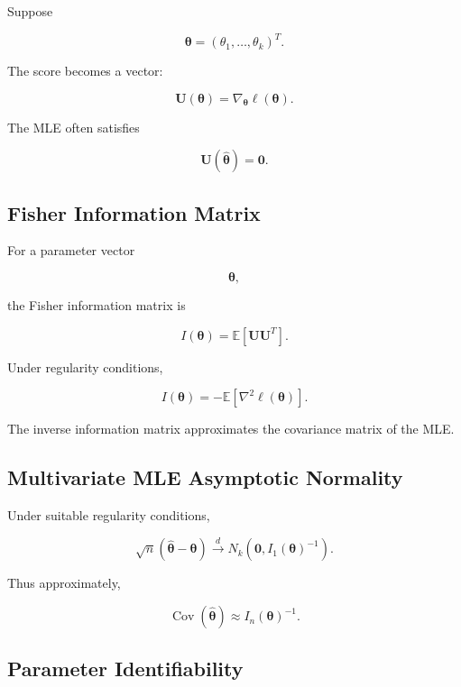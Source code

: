 Suppose

\[
\boldsymbol{\theta}
=
(\theta_1,\ldots,\theta_k)^T.
\]

The score becomes a vector:

\[
\boxed{
\mathbf{U}(\boldsymbol{\theta})
=
\nabla_{\boldsymbol{\theta}}
\ell(\boldsymbol{\theta}).
}
\]

The MLE often satisfies

\[
\boxed{
\mathbf{U}
(
\widehat{\boldsymbol{\theta}}
)
=
\mathbf{0}.
}
\]

\subsection{Fisher Information Matrix}
\label{subsec:fisher-information-matrix}

For a parameter vector

\[
\boldsymbol{\theta},
\]

the Fisher information matrix is

\[
\boxed{
I(\boldsymbol{\theta})
=
\mathbb{E}
\left[
\mathbf{U}
\mathbf{U}^T
\right].
}
\]

Under regularity conditions,

\[
\boxed{
I(\boldsymbol{\theta})
=
-
\mathbb{E}
\left[
\nabla^2
\ell(\boldsymbol{\theta})
\right].
}
\]

The inverse information matrix approximates the covariance matrix of the
MLE.

\subsection{Multivariate MLE Asymptotic Normality}
\label{subsec:multivariate-mle-normality}

Under suitable regularity conditions,

\[
\boxed{
\sqrt{n}
\left(
\widehat{\boldsymbol{\theta}}
-
\boldsymbol{\theta}
\right)
\xrightarrow{d}
N_k
\left(
\mathbf{0},
I_1(\boldsymbol{\theta})^{-1}
\right).
}
\]

Thus approximately,

\[
\boxed{
\operatorname{Cov}
(
\widehat{\boldsymbol{\theta}}
)
\approx
I_n(\boldsymbol{\theta})^{-1}.
}
\]

\subsection{Parameter Identifiability}
\label{subsec:parameter-identifiability}


